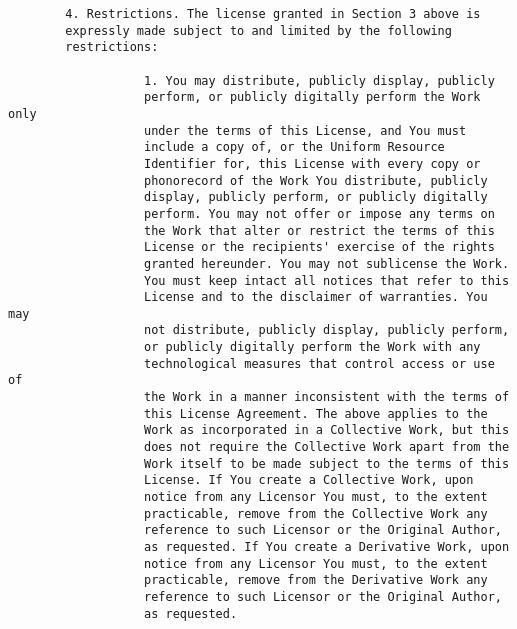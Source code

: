 \begin{verbatim}
        4. Restrictions. The license granted in Section 3 above is
        expressly made subject to and limited by the following
        restrictions:

                   1. You may distribute, publicly display, publicly
                   perform, or publicly digitally perform the Work only
                   under the terms of this License, and You must
                   include a copy of, or the Uniform Resource
                   Identifier for, this License with every copy or
                   phonorecord of the Work You distribute, publicly
                   display, publicly perform, or publicly digitally
                   perform. You may not offer or impose any terms on
                   the Work that alter or restrict the terms of this
                   License or the recipients' exercise of the rights
                   granted hereunder. You may not sublicense the Work.
                   You must keep intact all notices that refer to this
                   License and to the disclaimer of warranties. You may
                   not distribute, publicly display, publicly perform,
                   or publicly digitally perform the Work with any
                   technological measures that control access or use of
                   the Work in a manner inconsistent with the terms of
                   this License Agreement. The above applies to the
                   Work as incorporated in a Collective Work, but this
                   does not require the Collective Work apart from the
                   Work itself to be made subject to the terms of this
                   License. If You create a Collective Work, upon
                   notice from any Licensor You must, to the extent
                   practicable, remove from the Collective Work any
                   reference to such Licensor or the Original Author,
                   as requested. If You create a Derivative Work, upon
                   notice from any Licensor You must, to the extent
                   practicable, remove from the Derivative Work any
                   reference to such Licensor or the Original Author,
                   as requested.
                

\end{verbatim}
